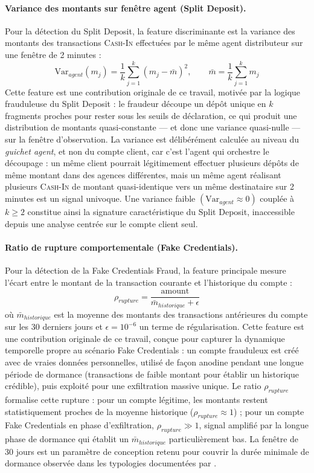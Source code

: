 \documentclass[11pt,a4paper,oneside]{report}
\theoremstyle{definition}
\theoremstyle{remark}
\begin{document}
\paragraph{Variance des montants sur fenêtre agent (Split Deposit).}
Pour la détection du Split Deposit, la feature discriminante est la variance des montants des transactions \textsc{Cash-In} effectuées par le même agent distributeur sur une fenêtre de 2 minutes :
\begin{equation}
    \text{Var}_{agent}(m_j) = \frac{1}{k}\sum_{j=1}^{k}\left(m_j - \bar{m}\right)^2, \qquad \bar{m} = \frac{1}{k}\sum_{j=1}^{k} m_j
\end{equation}
Cette feature est une contribution originale de ce travail, motivée par la logique frauduleuse du Split Deposit : le fraudeur découpe un dépôt unique en $k$ fragments proches pour rester sous les seuils de déclaration, ce qui produit une distribution de montants quasi-constante — et donc une variance quasi-nulle — sur la fenêtre d'observation. La variance est délibérément calculée au niveau du \emph{guichet agent}, et non du compte client, car c'est l'agent qui orchestre le découpage : un même client pourrait légitimement effectuer plusieurs dépôts de même montant dans des agences différentes, mais un même agent réalisant plusieurs \textsc{Cash-In} de montant quasi-identique vers un même destinataire sur 2 minutes est un signal univoque. Une variance faible $(\text{Var}_{agent} \approx 0)$ couplée à $k \geq 2$ constitue ainsi la signature caractéristique du Split Deposit, inaccessible depuis une analyse centrée sur le compte client seul.

\paragraph{Ratio de rupture comportementale (Fake Credentials).}
Pour la détection de la Fake Credentials Fraud, la feature principale mesure l'écart entre le montant de la transaction courante et l'historique du compte :
\begin{equation}
    \rho_{rupture} = \frac{\text{amount}}{\bar{m}_{historique} + \epsilon}
\end{equation}
où $\bar{m}_{historique}$ est la moyenne des montants des transactions antérieures du compte sur les 30 derniers jours et $\epsilon = 10^{-6}$ un terme de régularisation. Cette feature est une contribution originale de ce travail, conçue pour capturer la dynamique temporelle propre au scénario Fake Credentials : un compte frauduleux est créé avec de vraies données personnelles, utilisé de façon anodine pendant une longue période de dormance (transactions de faible montant pour établir un historique crédible), puis exploité pour une exfiltration massive unique. Le ratio $\rho_{rupture}$ formalise cette rupture : pour un compte légitime, les montants restent statistiquement proches de la moyenne historique ($\rho_{rupture} \approx 1$) ; pour un compte Fake Credentials en phase d'exfiltration, $\rho_{rupture} \gg 1$, signal amplifié par la longue phase de dormance qui établit un $\bar{m}_{historique}$ particulièrement bas. La fenêtre de 30 jours est un paramètre de conception retenu pour couvrir la durée minimale de dormance observée dans les typologies documentées par \citet{gsma2024fraud}.
\end{document}
